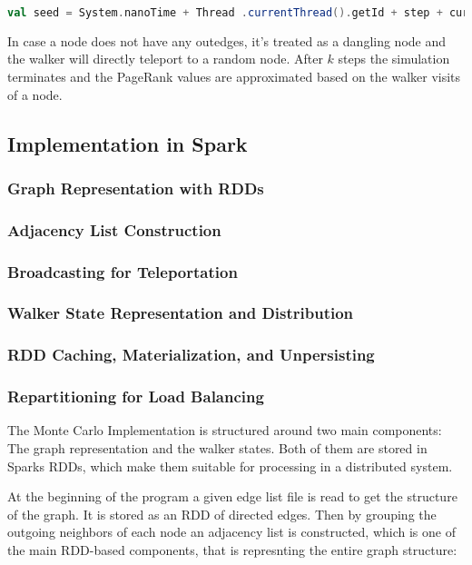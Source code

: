 \vspace{0.5em}
\begin{lstlisting}[language=Scala, caption={Random Seed}, label={lst:randseed}]
val seed = System.nanoTime + Thread .currentThread().getId + step + currentNode.toInt
\end{lstlisting}
\vspace{0.5em}

In case a node does not have any outedges, it's treated as a dangling node and the walker will directly teleport to a random node.
After $k$ steps the simulation terminates and the PageRank values are approximated based on the walker visits of a node.

\subsection{Implementation in Spark}
\subsubsection{Graph Representation with RDDs}
\subsubsection{Adjacency List Construction}
\subsubsection{Broadcasting for Teleportation}
\subsubsection{Walker State Representation and Distribution}
\subsubsection{RDD Caching, Materialization, and Unpersisting}
\subsubsection{Repartitioning for Load Balancing}

The Monte Carlo Implementation is structured around two main components: The graph representation and the walker states. Both of them are stored in Sparks RDDs, which make them suitable for processing in a distributed system.

At the beginning of the program a given edge list file is read to get the structure of the graph. It is stored as an RDD of directed edges. Then by grouping the outgoing neighbors of each node an adjacency list is constructed, which is one of the main RDD-based components, that is represnting the entire graph structure:

